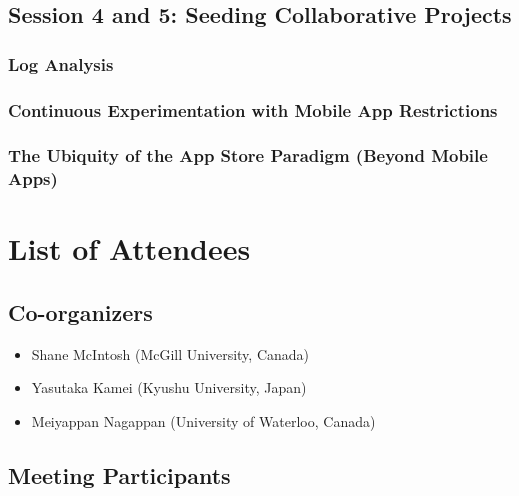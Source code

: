 \documentclass[a4paper]{article}
\begin{document}
\subsection{Session 4 and 5: Seeding Collaborative Projects}

\subsubsection{Log Analysis}

\subsubsection{Continuous Experimentation with Mobile App Restrictions}

\subsubsection{The Ubiquity of the App Store Paradigm (Beyond Mobile Apps)}

\clearpage

\section{List of Attendees}

\subsection{Co-organizers}

\begin{itemize}
\item Shane McIntosh (McGill University, Canada)
\item Yasutaka Kamei (Kyushu University, Japan)
\item Meiyappan Nagappan (University of Waterloo, Canada)
\end{itemize}

\subsection{Meeting Participants}
\end{document}
